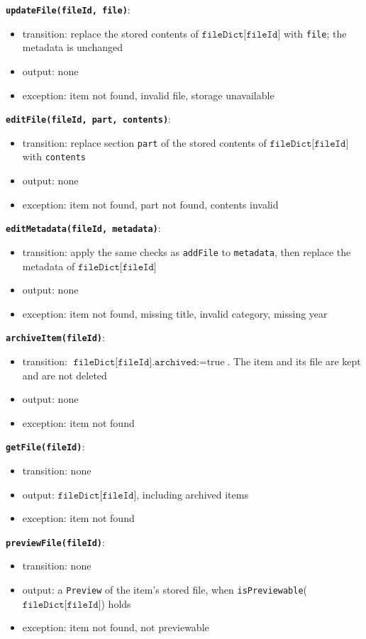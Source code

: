 \documentclass[12pt, titlepage]{article}
\begin{document}
\textbf{\texttt{updateFile(fileId, file)}}:
\begin{itemize}
  \item transition: replace the stored contents of $\texttt{fileDict[fileId]}$ with \texttt{file}; the metadata is unchanged
  \item output: none
  \item exception: item not found, invalid file, storage unavailable
\end{itemize}

\textbf{\texttt{editFile(fileId, part, contents)}}:
\begin{itemize}
  \item transition: replace section \texttt{part} of the stored contents of $\texttt{fileDict[fileId]}$ with \texttt{contents}
  \item output: none
  \item exception: item not found, part not found, contents invalid
\end{itemize}

\textbf{\texttt{editMetadata(fileId, metadata)}}:
\begin{itemize}
  \item transition: apply the same checks as \texttt{addFile} to \texttt{metadata}, then replace the metadata of $\texttt{fileDict[fileId]}$
  \item output: none
  \item exception: item not found, missing title, invalid category, missing year
\end{itemize}

\textbf{\texttt{archiveItem(fileId)}}:
\begin{itemize}
  \item transition: $\texttt{fileDict[fileId].archived} := \text{true}$. The item and its file are kept and are not deleted
  \item output: none
  \item exception: item not found
\end{itemize}

\textbf{\texttt{getFile(fileId)}}:
\begin{itemize}
  \item transition: none
  \item output: $\texttt{fileDict[fileId]}$, including archived items
  \item exception: item not found
\end{itemize}

\textbf{\texttt{previewFile(fileId)}}:
\begin{itemize}
  \item transition: none
  \item output: a \texttt{Preview} of the item's stored file, when \texttt{isPreviewable}($\texttt{fileDict[fileId]}$) holds
  \item exception: item not found, not previewable
\end{itemize}
\end{document}
